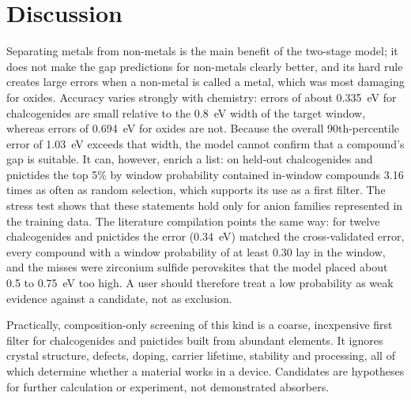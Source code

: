 \documentclass[11pt,a4paper]{article}
\begin{document}
\section{Discussion}
Separating metals from non-metals is the main benefit of the two-stage model; it does not make the gap predictions for non-metals clearly better, and its hard rule creates large errors when a non-metal is called a metal, which was most damaging for oxides.
Accuracy varies strongly with chemistry: errors of about 0.335~eV for chalcogenides are small relative to the 0.8~eV width of the target window, whereas errors of 0.694~eV for oxides are not. Because the overall 90th-percentile error of 1.03~eV exceeds that width,
the model cannot confirm that a compound's gap is suitable. It can, however, enrich a list: on held-out chalcogenides and pnictides the top 5\% by window probability contained in-window compounds 3.16 times as often as random selection, which supports its use as a first filter. The stress test shows that these statements hold only for anion families represented in the training data. The literature compilation points the same way: for twelve chalcogenides and pnictides the error (0.34~eV) matched the cross-validated error, every compound with a window probability of at least 0.30 lay in the window, and the misses were zirconium sulfide perovskites that the model placed about 0.5 to 0.75~eV too high. A user should therefore treat a low probability as weak evidence against a candidate, not as exclusion.

Practically, composition-only screening of this kind is a coarse, inexpensive first filter for chalcogenides and pnictides built from abundant elements. It ignores crystal structure, defects, doping, carrier lifetime, stability and processing, all of which determine whether a material works in a device.
Candidates are hypotheses for further calculation or experiment, not demonstrated absorbers.
\end{document}
